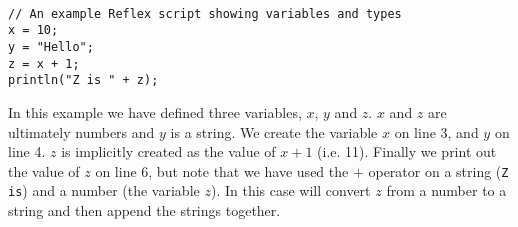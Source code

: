 \begin{lstlisting}[caption={Variables and Types}]

// An example Reflex script showing variables and types
x = 10;
y = "Hello";
z = x + 1;
println("Z is " + z);
\end{lstlisting}

In this example we have defined three variables, $x$, $y$ and $z$. $x$ and $z$ are ultimately numbers and $y$ is a string. We create the variable $x$ on line 3, and $y$ on line 4. $z$ is implicitly created as the value of $x+1$ (i.e. 11). Finally we print out the value of $z$ on line 6, but note that we have used the $+$ operator on a string (\Verb+Z is+) and a number (the variable $z$). In this case \Reflex will convert $z$ from a number to a string and then append the strings together.

